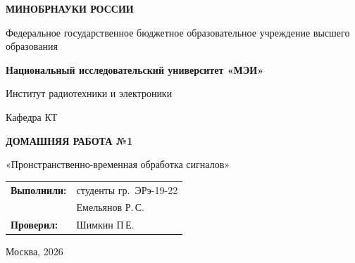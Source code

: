 \begin{titlepage}
    \centering
    {\bfseries МИНОБРНАУКИ РОССИИ\par}
    Федеральное государственное бюджетное образовательное учреждение высшего образования \\
    {\bfseries Национальный исследовательский университет «МЭИ»\par}
    \vspace{1cm}
    Институт радиотехники и электроники\par
    Кафедра КТ\par
    \vspace{3cm}
    
    {\bfseries\large ДОМАШНЯЯ РАБОТА №1\par}
    \vspace{0.5cm}
    {\large «Пронстранственно-временная обработка сигналов»\par}
    
    \vspace{3.5cm}
 \vspace{1.5cm}
\noindent\hfill
\begin{tabular}{@{}ll@{}}
    \textbf{Выполнили:} & студенты гр.~ЭРэ-19-22 \\
                        & Емельянов Р.\,С. \\
    \textbf{Проверил:}  & Шимкин П\,Е.
\end{tabular}   
    \vfill
    {Москва, 2026}
\end{titlepage}
